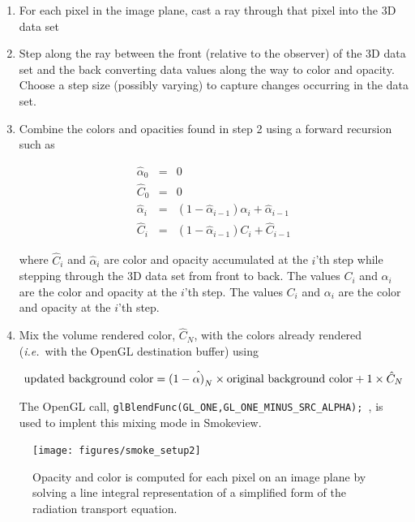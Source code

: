 \begin{enumerate}

\item For each pixel in the image plane, cast a ray through that pixel into the 3D data set

\item Step along the ray between the front (relative to the observer) of the 3D data set and the back
converting data values along the way to color and opacity.  Choose a step size (possibly varying) to capture changes occurring in the data set.

\item
Combine the colors and opacities found in step 2 using a forward recursion such as \cite[Chapter 39]{gpugems}

\begin{eqnarray*}
\hat{\alpha}_0&=&0\\
\hat{C}_0&=&0\\
\hat{\alpha}_i&=&\left(1-\hat{\alpha}_{i-1}\right)\alpha_i+\hat{\alpha}_{i-1}\\
\hat{C}_i&=&\left(1-\hat{\alpha}_{i-1}\right)C_i + \hat{C}_{i-1}
\end{eqnarray*}

where $\hat{C}_i$ and $\hat{\alpha}_i$ are color and opacity accumulated at the $i$'th step while stepping through the 3D data set from front to back.  The values $C_i$ and $\alpha_i$ are the color and opacity at the $i$'th step.  The values $C_i$ and $\alpha_i$
are the color and opacity at the $i$'th step.

\item Mix the volume rendered color, $\hat{C}_N$, with the colors already rendered ({\em i.e.}\ with the OpenGL destination buffer) using

\begin{eqnarray*}
\noindent\mbox{updated background color} = (1-\hat{\alpha)}_N\times \mbox{original background
color} + 1\times\hat{C}_N
\end{eqnarray*}

The OpenGL call, {\tt   glBlendFunc(GL\_ONE,GL\_ONE\_MINUS\_SRC\_ALPHA); }, is used to implent this mixing mode in Smokeview.
\end{enumerate}

\begin{figure}[\figoptions]
\begin{center}
\texttt{[image: figures/smoke\_setup2]}
\end{center}
\caption {Opacity and color is computed for each pixel on an image plane by solving a line integral
representation of a simplified form of the radiation transport equation.
}
\label{figsmokesetup2}
\end{figure}

